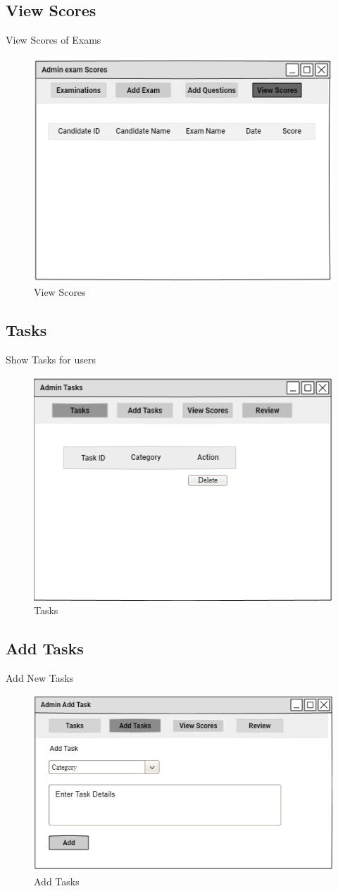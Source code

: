 \documentclass[a4paper,12pt]{report}
\begin{document}
\subsection {View Scores}
View Scores of Exams
\begin{figure}[bph]
	\centering
	\includegraphics[width=.55\linewidth]{img/admin/adminviewscores}
	\caption{View Scores}
\end{figure}

\subsection {Tasks}
Show Tasks for users
\begin{figure}[bph]
	\centering
	\includegraphics[width=.55\linewidth]{img/admin/admintasks}
	\caption{Tasks}
\end{figure}
\pagebreak

\subsection {Add Tasks}
Add New Tasks
\begin{figure}[bph]
	\centering
	\includegraphics[width=.6\linewidth]{img/admin/adminaddtasks}
	\caption{Add Tasks}
\end{figure}
\end{document}
